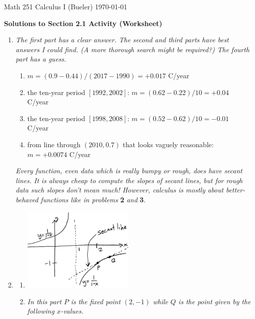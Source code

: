 \documentclass[11pt]{amsart}
\begin{document}
\noindent \scriptsize Math 251 Calculus I (Bueler) \hfill \today

\medskip
\Large\centerline{\textbf{Solutions to Section 2.1 Activity (Worksheet)}}

\normalsize
\thispagestyle{empty}

\medskip
\renewcommand{\labelenumi}{\textbf{\arabic{enumi}.}}
\begin{enumerate}
\item \emph{The first part has a clear answer.  The second and third parts have best answers I could find.  (A more thorough search might be required?) The fourth part has a guess.} 

\medskip
    \renewcommand{\labelenumii}{\arabic{enumii}.}
    \begin{enumerate}
    \item $m = (0.9-0.44) / (2017-1990) = + 0.017$ C/year
    \item the ten-year period $[1992,2002]$: \quad $m=(0.62 - 0.22) / 10 = + 0.04$ C/year
    \item the ten-year period $[1998,2008]$: \quad $m=(0.52 - 0.62) / 10 = - 0.01$ C/year
    \item from line through $(2010,0.7)$ that looks vaguely reasonable: $m = + 0.0074$ C/year
    \end{enumerate}

\medskip
\noindent \emph{Every function, even data which is really bumpy or rough, \emph{does} have secant lines.  It is always cheap to compute the slopes of secant lines, but for rough data such slopes don't mean much!  However, calculus is mostly about better-behaved functions like in problems} \textbf{2} \emph{and} \textbf{3}.

\item 
\medskip
    \renewcommand{\labelenumii}{\alph{enumii})}
    \begin{enumerate}
    \item \includegraphics[align=t,width=0.45\textwidth]{secantgraph}

\bigskip
    \item \emph{In this part $P$ is the fixed point $(2,-1)$ while $Q$ is the point given by the following $x$-values.}
    

\end{enumerate}
\end{enumerate}
\end{document}

